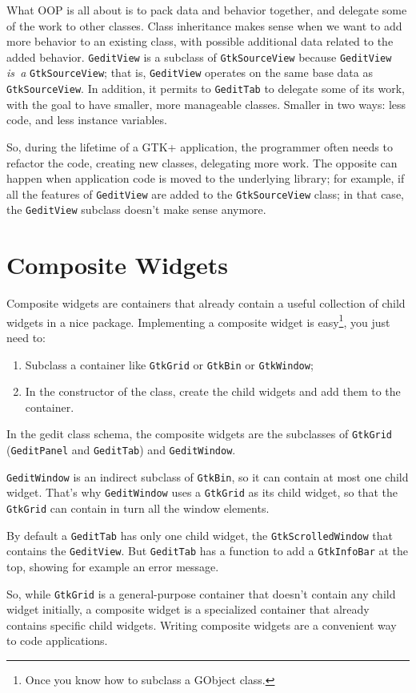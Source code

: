 What OOP is all about is to pack data and behavior together, and delegate some of the work to other classes. Class inheritance makes sense when we want to add more behavior to an existing class, with possible additional data related to the added behavior. \lstinline{GeditView} is a subclass of \lstinline{GtkSourceView} because \lstinline{GeditView} \emph{is~a} \lstinline{GtkSourceView}; that is, \lstinline{GeditView} operates on the same base data as \lstinline{GtkSourceView}. In addition, it permits to \lstinline{GeditTab} to delegate some of its work, with the goal to have smaller, more manageable classes. Smaller in two ways: less code, and less instance variables.

So, during the lifetime of a GTK+ application, the programmer often needs to refactor the code, creating new classes, delegating more work. The opposite can happen when application code is moved to the underlying library; for example, if all the features of \lstinline{GeditView} are added to the \lstinline{GtkSourceView} class; in that case, the \lstinline{GeditView} subclass doesn't make sense anymore.

\section{Composite Widgets}

Composite widgets are containers that already contain a useful collection of child widgets in a nice package. Implementing a composite widget is easy\footnote{Once you know how to subclass a GObject class.}, you just need to:
\begin{enumerate}
  \item Subclass a container like \lstinline{GtkGrid} or \lstinline{GtkBin} or \lstinline{GtkWindow};
  \item In the constructor of the class, create the child widgets and add them to the container.
\end{enumerate}

In the gedit class schema, the composite widgets are the subclasses of \lstinline{GtkGrid} (\lstinline{GeditPanel} and \lstinline{GeditTab}) and \lstinline{GeditWindow}.

\lstinline{GeditWindow} is an indirect subclass of \lstinline{GtkBin}, so it can contain at most one child widget. That's why \lstinline{GeditWindow} uses a \lstinline{GtkGrid} as its child widget, so that the \lstinline{GtkGrid} can contain in turn all the window elements.

By default a \lstinline{GeditTab} has only one child widget, the \lstinline{GtkScrolledWindow} that contains the \lstinline{GeditView}. But \lstinline{GeditTab} has a function to add a \lstinline{GtkInfoBar} at the top, showing for example an error message.

So, while \lstinline{GtkGrid} is a general-purpose container that doesn't contain any child widget initially, a composite widget is a specialized container that already contains specific child widgets. Writing composite widgets are a convenient way to code applications.

